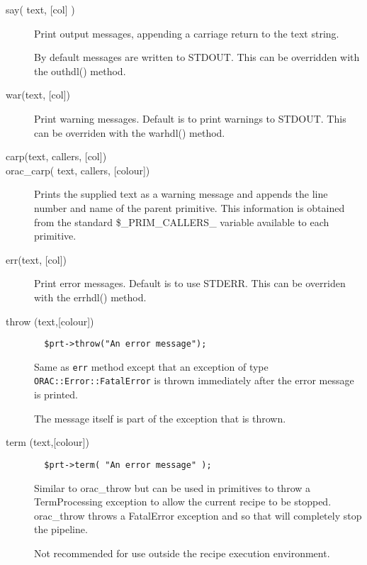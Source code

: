 \begin{description}
\begin{description}
\begin{description}
\item[{say( text, [col] )}] \mbox{}

Print output messages, appending a carriage return to the text string.



By default messages are written to STDOUT. This can be overridden with the outhdl() method.


\item[{war(text, [col])}] \mbox{}

Print warning messages.
Default is to print warnings to STDOUT. This can be overriden with
the warhdl() method.


\item[{carp(text, callers, [col])}] \mbox{}
\item[{orac\_carp( text, callers, [colour])}] \mbox{}

Prints the supplied text as a warning message and appends the line number
and name of the parent primitive. This information is obtained from the
standard \$\_PRIM\_CALLERS\_ variable available to each primitive.


\item[{err(text, [col])}] \mbox{}

Print error messages.
Default is to use STDERR. This can be overriden with the errhdl()
method.


\item[{throw (text,[colour])}] \mbox{}\begin{verbatim}
  $prt->throw("An error message");
\end{verbatim}


Same as \texttt{err} method except that an exception of type
\texttt{ORAC::Error::FatalError} is thrown immediately after the error
message is printed.



The message itself is part of the exception that is thrown.


\item[{term (text,[colour])}] \mbox{}\begin{verbatim}
  $prt->term( "An error message" );
\end{verbatim}


Similar to orac\_throw but can be used in primitives to throw a TermProcessing
exception to allow the current recipe to be stopped. orac\_throw throws a
FatalError exception and so that will completely stop the pipeline.



Not recommended for use outside the recipe execution environment.



\end{description}
\end{description}
\end{description}
